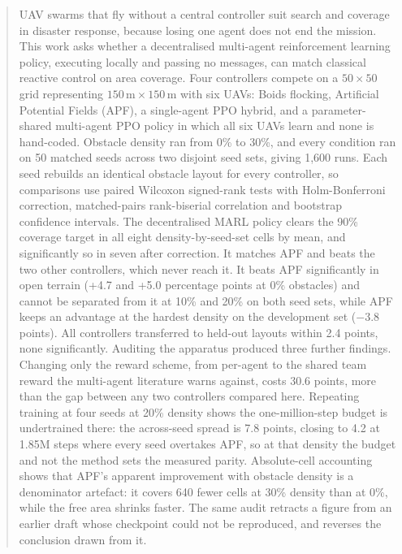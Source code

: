 \documentclass[a4paper, 10pt, conference]{ieeeconf}
\begin{document}
\begin{abstract}
UAV swarms that fly without a central controller suit search and
coverage in disaster response, because losing one agent does not end
the mission. This work asks whether a decentralised multi-agent
reinforcement learning policy, executing locally and passing no
messages, can match classical reactive control on area coverage. Four
controllers compete on a $50\times50$ grid representing
$150\,\text{m}\times150\,\text{m}$ with six UAVs: Boids flocking,
Artificial Potential Fields (APF), a single-agent PPO hybrid, and a
parameter-shared multi-agent PPO policy in which all six UAVs learn
and none is hand-coded. Obstacle density ran from 0\% to 30\%, and
every condition ran on 50 matched seeds across two disjoint seed sets,
giving 1{,}600 runs. Each seed rebuilds an identical obstacle layout
for every controller, so comparisons use paired Wilcoxon signed-rank
tests with Holm-Bonferroni correction, matched-pairs rank-biserial
correlation and bootstrap confidence intervals. The decentralised MARL
policy clears the 90\% coverage target in all eight
density-by-seed-set cells by mean, and significantly so in seven after
correction. It matches APF and beats the two other controllers, which
never reach it. It beats APF significantly in open terrain (+4.7 and
+5.0 percentage points at 0\% obstacles) and cannot be separated from
it at 10\% and 20\% on both seed sets, while APF keeps an advantage at
the hardest density on the development set ($-3.8$ points). All
controllers transferred to held-out layouts within 2.4 points, none
significantly. Auditing the apparatus produced three further findings.
Changing only the reward scheme, from per-agent to the shared team
reward the multi-agent literature warns against, costs 30.6 points,
more than the gap between any two controllers compared here. Repeating
training at four seeds at 20\% density shows the one-million-step
budget is undertrained there: the across-seed spread is 7.8 points,
closing to 4.2 at 1.85M steps where every seed overtakes APF, so at
that density the budget and not the method sets the measured parity.
Absolute-cell accounting shows that APF's apparent improvement with
obstacle density is a denominator artefact: it covers 640 fewer cells
at 30\% density than at 0\%, while the free area shrinks faster. The
same audit retracts a figure from an earlier draft whose checkpoint
could not be reproduced, and reverses the conclusion drawn from it.
\end{abstract}
\end{document}
